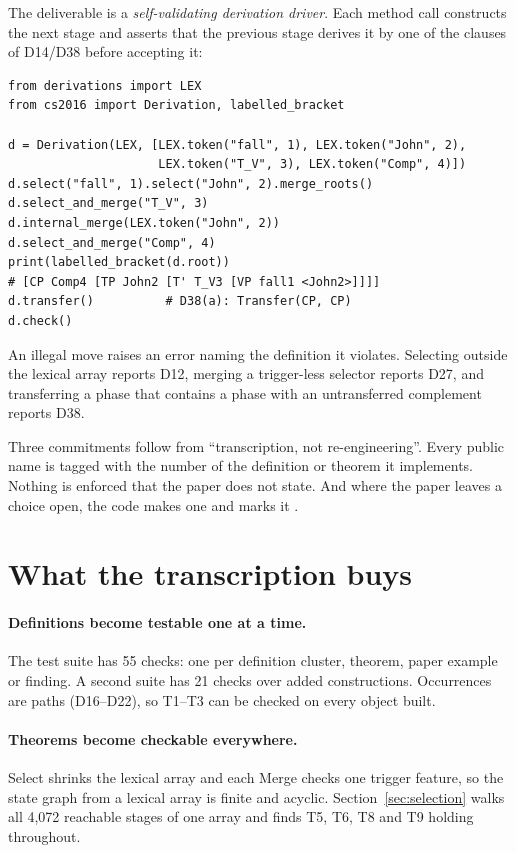 \documentclass[11pt,a4paper]{article}
\newcommand{\code}[1]{\texttt{\detokenize{#1}}}
\begin{document}
The deliverable is a \emph{self-validating derivation driver}. Each method
call constructs the next stage and asserts that the previous stage derives it
by one of the clauses of D14/D38 before accepting it:

\begin{lstlisting}
from derivations import LEX
from cs2016 import Derivation, labelled_bracket

d = Derivation(LEX, [LEX.token("fall", 1), LEX.token("John", 2),
                     LEX.token("T_V", 3), LEX.token("Comp", 4)])
d.select("fall", 1).select("John", 2).merge_roots()
d.select_and_merge("T_V", 3)
d.internal_merge(LEX.token("John", 2))
d.select_and_merge("Comp", 4)
print(labelled_bracket(d.root))
# [CP Comp4 [TP John2 [T' T_V3 [VP fall1 <John2>]]]]
d.transfer()          # D38(a): Transfer(CP, CP)
d.check()
\end{lstlisting}

\noindent
An illegal move raises an error naming the definition it violates. Selecting
outside the lexical array reports D12, merging a trigger-less selector
reports D27, and transferring a phase that contains a phase with an
untransferred complement reports D38.

Three commitments follow from ``transcription, not re-engineering''. Every
public name is tagged with the number of the definition or theorem it
implements. Nothing is enforced that the paper does not state. And where the
paper leaves a choice open, the code makes one and marks it
\code{# STIPULATION}.

\section{What the transcription buys}

\paragraph{Definitions become testable one at a time.} The test suite has 55
checks: one per definition cluster, theorem, paper example or finding. A
second suite has 21 checks over added constructions. Occurrences are paths
(D16--D22), so T1--T3 can be checked on every object built.

\paragraph{Theorems become checkable everywhere.} Select shrinks the lexical
array and each Merge checks one trigger feature, so the state graph from a
lexical array is finite and acyclic. Section~\ref{sec:selection} walks all
4{,}072 reachable stages of one array and finds T5, T6, T8 and T9 holding
throughout.
\end{document}
